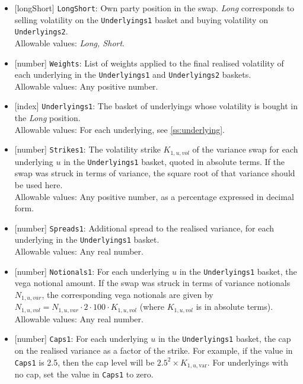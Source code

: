 \begin{itemize}
  \item{}[longShort] \lstinline!LongShort!: Own party position in the swap. \emph{Long} corresponds to selling volatility on
  the \lstinline!Underlyings1! basket and buying volatility on \lstinline!Underlyings2!. \\
  Allowable values: \emph{Long, Short}.
  \item{}[number] \lstinline!Weights!: List of weights applied to the final realised volatility of each underlying
  in the \lstinline!Underlyings1! and \lstinline!Underlyings2! baskets. \\
  Allowable values: Any positive number.
  \item{}[index] \lstinline!Underlyings1!: The basket of underlyings whose volatility is bought in the \emph{Long} position. \\
  Allowable values: For each underlying, see \ref{ss:underlying}.
  \item{}[number] \lstinline!Strikes1!: The volatility strike $K_{1,u,vol}$ of the variance swap for each underlying $u$
  in the \lstinline!Underlyings1! basket, quoted in absolute terms. If the swap was
  struck in terms of variance, the square root of that variance should be used here.\\
  Allowable values: Any positive number, as a percentage expressed in decimal form.
  \item{}[number] \lstinline!Spreads1!: Additional spread to the realised variance, for each underlying in the
  \lstinline!Underlyings1! basket. \\
  Allowable values: Any real number.
  \item{}[number] \lstinline!Notionals1!: For each underlying $u$ in the \lstinline!Underlyings1! basket, the vega notional amount.
  If the swap was struck in terms of variance notionals $N_{1,u,var}$, the corresponding vega notionals are given by
  $N_{1,u,vol} = N_{1,u,var} \cdot 2 \cdot 100 \cdot K_{1,u,vol}$ (where $K_{1,u,vol}$ is in
  absolute terms). \\
  Allowable values: Any real number.
  \item{}[number] \lstinline!Caps1!: For each underlying $u$ in the \lstinline!Underlyings1! basket, the cap on the realised variance
  as a factor of the strike. For example, if the value in \lstinline!Caps1! is 2.5, then the cap level will be
  $2.5^2 \times K_{1,u,\text{var}}$. For underlyings with no cap, set the value in \lstinline!Caps1! to zero. \\

\end{itemize}
